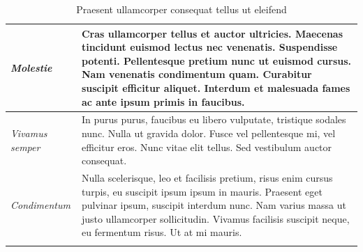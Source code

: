\begin{center}
\begin{longtable}{ | p{} | p{} | }
		\emph{Molestie}
		& Cras ullamcorper tellus et auctor ultricies. Maecenas tincidunt euismod lectus nec venenatis. Suspendisse potenti. Pellentesque pretium nunc ut euismod cursus. Nam venenatis condimentum quam. Curabitur suscipit efficitur aliquet. Interdum et malesuada fames ac ante ipsum primis in faucibus.
		\\ \hline
		
		\emph{Vivamus semper}
		& In purus purus, faucibus eu libero vulputate, tristique sodales nunc. Nulla ut gravida dolor. Fusce vel pellentesque mi, vel efficitur eros. Nunc vitae elit tellus. Sed vestibulum auctor consequat. 
		\\ \hline
		
		\emph{Condimentum}
		& Nulla scelerisque, leo et facilisis pretium, risus enim cursus turpis, eu suscipit ipsum ipsum in mauris. Praesent eget pulvinar ipsum, suscipit interdum nunc. Nam varius massa ut justo ullamcorper sollicitudin. Vivamus facilisis suscipit neque, eu fermentum risus. Ut at mi mauris.
		\\ \hline
		
		\caption{Praesent ullamcorper consequat tellus ut eleifend}
		\label{tab:example-3}		
	\end{longtable}
\end{center}